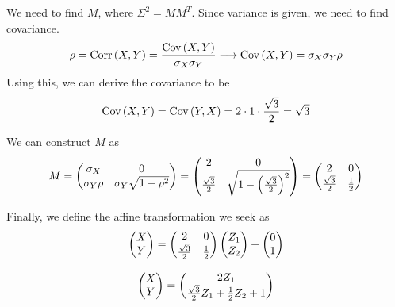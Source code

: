 \documentclass{exam}
\begin{document}
\begin{questions}
We need to find $M$, where $\Sigma^2 = MM^T$. Since variance is given, we need to find covariance.
$$\rho = \text{Corr}\left( X, Y \right) = \frac{\text{Cov}\left( X, Y \right)}{\sigma_X\sigma_Y} \longrightarrow \text{Cov}\left( X, Y \right) = \sigma_X\sigma_Y\rho$$
Using this, we can derive the covariance to be
$$\text{Cov}\left( X, Y \right) = \text{Cov}\left( Y, X \right) = 2\cdot 1\cdot \frac{\sqrt{3}}{2} = \sqrt{3}$$

We can construct $M$ as
$$M = \left( \begin{matrix}
    \sigma_X & 0 \\
    \sigma_Y\rho & \sigma_Y\sqrt{1 - \rho^2} \\
\end{matrix} \right) = \left( \begin{matrix}
    2 & 0 \\
    \frac{\sqrt{3}}{2} & \sqrt{1 - \left( \frac{\sqrt{3}}{2} \right)^2}\\
\end{matrix} \right) = \left( \begin{matrix}
    2 & 0 \\
    \frac{\sqrt{3}}{2} & \frac{1}{2} \\
\end{matrix} \right)$$

Finally, we define the affine transformation we seek as
$$\left( \begin{matrix}
    X \\ Y \\
\end{matrix} \right) = 
\left( \begin{matrix}
    2 & 0 \\
    \frac{\sqrt{3}}{2} & \frac{1}{2} \\
\end{matrix} \right)\left( \begin{matrix}
    Z_1 \\ Z_2 \\
\end{matrix} \right) + \left( \begin{matrix}
    0 \\ 1 \\
\end{matrix} \right)$$

$$\left( \begin{matrix}
    X \\ Y \\
\end{matrix} \right) = \left( \begin{matrix}
    2Z_1 \\ \frac{\sqrt{3}}{2}Z_1 + \frac{1}{2}Z_2 + 1
\end{matrix} \right)$$
\end{questions}
\end{document}

